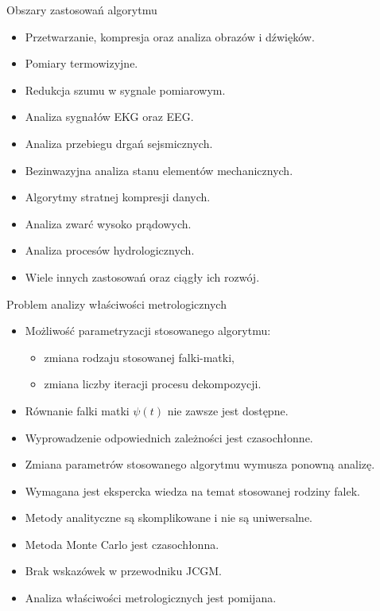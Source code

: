 \documentclass[12pt, polish, aspectratio = 169]{slides}
\begin{document}
\begin{frame}{Obszary zastosowań algorytmu}
\begin{itemize}
\item Przetwarzanie, kompresja oraz analiza obrazów i dźwięków.
\item Pomiary termowizyjne.
\item Redukcja szumu w sygnale pomiarowym.
\item Analiza sygnałów EKG oraz EEG.
\item Analiza przebiegu drgań sejsmicznych.
\item Bezinwazyjna analiza stanu elementów mechanicznych.
\item Algorytmy stratnej kompresji danych.
\item Analiza zwarć wysoko prądowych.
\item Analiza procesów hydrologicznych.
\item Wiele innych zastosowań oraz ciągły ich rozwój.
\end{itemize}
\end{frame}

\begin{frame}{Problem analizy właściwości metrologicznych}
\begin{itemize}
\item Możliwość parametryzacji stosowanego algorytmu:
	\begin{itemize}
	\item zmiana rodzaju stosowanej falki-matki,
	\item zmiana liczby iteracji procesu dekompozycji.
	\end{itemize}
\item Równanie falki matki $\psi(t)$ nie zawsze jest dostępne.
\item Wyprowadzenie odpowiednich zależności jest czasochłonne.
\item Zmiana parametrów stosowanego algorytmu wymusza ponowną analizę.
\item Wymagana jest ekspercka wiedza na temat stosowanej rodziny falek.
\item Metody analityczne są skomplikowane i nie są uniwersalne.
\item Metoda Monte Carlo jest czasochłonna.
\item Brak wskazówek w przewodniku JCGM.
\item Analiza właściwości metrologicznych jest pomijana.
\end{itemize}
\end{frame}
\end{document}
